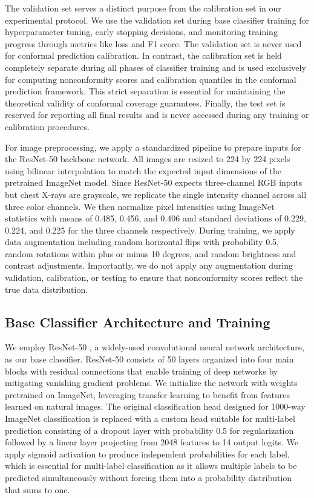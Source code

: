 The validation set serves a distinct purpose from the calibration set in our experimental protocol.
We use the validation set during base classifier training for hyperparameter tuning, early stopping decisions, and monitoring training progress through metrics like loss and F1 score.
The validation set is never used for conformal prediction calibration.
In contrast, the calibration set is held completely separate during all phases of classifier training and is used exclusively for computing nonconformity scores and calibration quantiles in the conformal prediction framework.
This strict separation is essential for maintaining the theoretical validity of conformal coverage guarantees.
Finally, the test set is reserved for reporting all final results and is never accessed during any training or calibration procedures.

For image preprocessing, we apply a standardized pipeline to prepare inputs for the ResNet-50 backbone network.
All images are resized to 224 by 224 pixels using bilinear interpolation to match the expected input dimensions of the pretrained ImageNet model.
Since ResNet-50 expects three-channel RGB inputs but chest X-rays are grayscale, we replicate the single intensity channel across all three color channels.
We then normalize pixel intensities using ImageNet statistics with means of 0.485, 0.456, and 0.406 and standard deviations of 0.229, 0.224, and 0.225 for the three channels respectively.
During training, we apply data augmentation including random horizontal flips with probability 0.5, random rotations within plus or minus 10 degrees, and random brightness and contrast adjustments.
Importantly, we do not apply any augmentation during validation, calibration, or testing to ensure that nonconformity scores reflect the true data distribution.

\subsection{Base Classifier Architecture and Training}
\label{subsec:base-classifier-architecture-and-training}

We employ ResNet-50 \citep{he2016deep}, a widely-used convolutional neural network architecture, as our base classifier.
ResNet-50 consists of 50 layers organized into four main blocks with residual connections that enable training of deep networks by mitigating vanishing gradient problems.
We initialize the network with weights pretrained on ImageNet, leveraging transfer learning to benefit from features learned on natural images.
The original classification head designed for 1000-way ImageNet classification is replaced with a custom head suitable for multi-label prediction consisting of a dropout layer with probability 0.5 for regularization followed by a linear layer projecting from 2048 features to 14 output logits.
We apply sigmoid activation to produce independent probabilities for each label, which is essential for multi-label classification as it allows multiple labels to be predicted simultaneously without forcing them into a probability distribution that sums to one.

